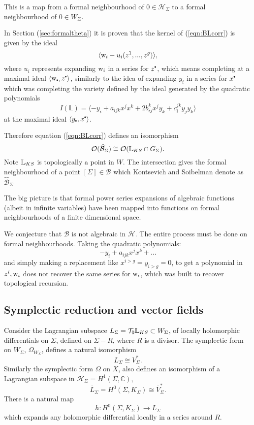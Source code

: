     This is a map from a formal neighbourhood of \( 0\in\mathcal{H}_\Sigma\) to a formal neighbourhood of \(0\in W_\Sigma \).
    
    In Section (\ref{sec:formaltheta}) it is proven that the kernel of (\ref{eqn:BLcorr}) is given by the ideal \[ \langle \mathrm{w}_i-u_i(z^1,...,z^g) \rangle, \]
    where \( u_i\) represents expanding \(\mathrm{w}_i \) in a series for \(z^{\sbt}\),  which means completing at a maximal ideal  \(\langle \w_{\sbt} ,z^{\sbt} \rangle \), similarly to the idea of expanding \(y_i\) in a series for \(x^{\sbt}\) which was completing the variety defined by the ideal generated by the quadratic polynomials
    \[ I(\mathbb{L})= \langle -y_i  + a_{ijk}x^j x^k + 2 b_{ij}^k x^j y_k + c_{i}^{jk} y_j y_k \rangle\]
    at the maximal ideal \( \langle y_{\sbt} , x^{\sbt} \rangle \).
    
    Therefore equation (\ref{eqn:BLcorr}) defines an isomorphism
    \[ \mathcal{O}(\widehat{\mathcal{B}}_\Sigma)\cong \mathcal{O}(\mathbb{L}_{KS}\cap G_\Sigma).\]
    Note \( \mathbb{L}_{KS}\) is topologically a point in \(W\). The intersection gives the formal neighbourhood of a point \([\Sigma]\in \mathcal{B}\) which Kontsevich and Soibelman denote as \( \widehat{\mathcal{B}}_\Sigma\)

    
    The big picture is that formal power series expansions of algebraic functions (albeit in infinite variables) have been mapped into functions on formal neighbourhoods of a finite dimensional space. 
    \begin{rem} 
    We conjecture that \( \mathcal{B}\) is not algebraic in \( \mathcal{H}\). The entire process must be done on formal neighbourhoods. Taking the quadratic polynomials:
    \[ -y_i + a_{ijk}x^j x^k + \dots \] 
    and simply making a replacement like \(x^{i>g} = y_{i>g} = 0\), to get a polynomial in \( z^i , \mathrm{w}_i\) does not recover the same series for \(\mathrm{w}_i\), which was built to recover topological recursion.
    \end{rem}
    
    \subsection{Symplectic reduction and vector fields}
    \label{sec:vectorfieldsSigma}
    Consider the Lagrangian subspace \( L_\Sigma = \mathcal{T}_0 \mathbb{L}_{KS} \subset W_\Sigma\), of locally holomorphic differentials on \( \Sigma\), defined on \( \Sigma - R\), where \(R\) is a divisor. The symplectic form on \(W_\Sigma\),  \( \Omega_{W_\Sigma}\), defines a natural isomorphism  
    \[ L_\Sigma \cong V_\Sigma^*.\]
    Similarly the symplectic form \( \Omega\) on \(X\), also defines an isomorphism of a Lagrangian subspace in \( \mathcal{H}_\Sigma = H^1(\Sigma, \mathbb{C})\), 
    \[ \overline{L}_\Sigma = H^0(\Sigma,K_\Sigma)\cong \overline{V}_\Sigma^*.\]
    There is a natural map 
    \[ h : H^0(\Sigma, K_\Sigma ) \rightarrow L_\Sigma\]
    which expands any holomorphic differential locally in a series around \(R\).
    

